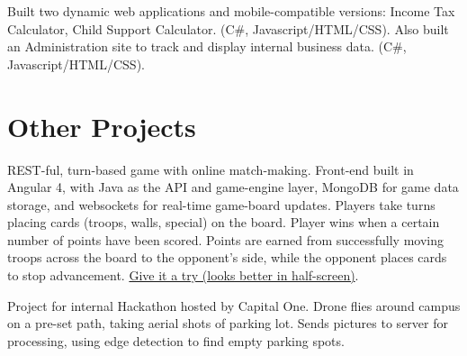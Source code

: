 \documentclass[letterpaper]{deedy-resume-openfont} %
\begin{document}
\begin{minipage}[t]{0.7\textwidth}
\sectionsep %



Built two dynamic web applications and mobile-compatible versions: Income Tax Calculator, Child Support Calculator. (C\#, Javascript/HTML/CSS). Also built an Administration site to track and display internal business data. (C\#, Javascript/HTML/CSS).


\sectionsep %


\section{Other Projects}



REST-ful, turn-based game with online match-making. Front-end built in Angular 4, with Java as the API and game-engine layer, MongoDB for game data storage, and websockets for real-time game-board updates. Players take turns placing cards (troops, walls, special) on the board. Player wins when a certain number of points have been scored. Points are earned from successfully moving troops across the board to the opponent's side, while the opponent places cards to stop advancement. \href{http://3.85.160.165:4200/}{Give it a try (looks better in half-screen)}.

\sectionsep %


Project for internal Hackathon hosted by Capital One. Drone flies around campus on a pre-set path, taking aerial shots of parking lot. Sends pictures to server for processing, using edge detection to find empty parking spots. 

\sectionsep %



\end{minipage}
\end{document}
